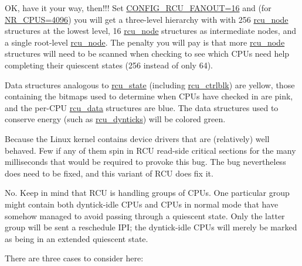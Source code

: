 
OK, have it your way, then!!!
Set \url{CONFIG_RCU_FANOUT=16} and (for \url{NR_CPUS=4096})
you will get a
three-level hierarchy with with 256 \url{rcu_node} structures
at the lowest level, 16 \url{rcu_node} structures as intermediate
nodes, and a single root-level \url{rcu_node}.
The penalty you will pay is that more \url{rcu_node} structures
will need to be scanned when checking to see which CPUs need help
completing their quiescent states (256 instead of only 64).


Data structures analogous to \url{rcu_state} (including
\url{rcu_ctrlblk}) are yellow,
those containing the bitmaps used to determine when CPUs have checked
in are pink,
and the per-CPU \url{rcu_data} structures are blue.
The data structures used to conserve energy
(such as \url{rcu_dynticks}) will be colored green.


Because the Linux kernel contains device drivers that are (relatively)
well behaved.
Few if any of them spin in RCU read-side critical sections for the
many milliseconds that would be required to provoke this bug.
The bug nevertheless does need to be fixed, and this variant of
RCU does fix it.


No.
Keep in mind that RCU is handling groups of CPUs.
One particular group might contain both dyntick-idle CPUs and
CPUs in normal mode that have somehow managed to avoid passing through
a quiescent state.
Only the latter group will be sent a reschedule IPI; the dyntick-idle
CPUs will merely be marked as being in an extended quiescent state.


There are three cases to consider here:

